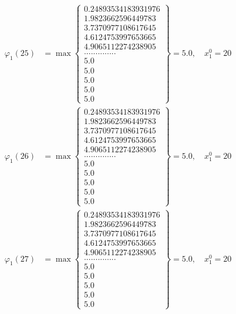 \documentclass{article}
\begin{document}
\begin{align*}
  
  
  
\varphi_{1}(25) &= \max \left\{ \begin{array}{c}
0.24893534183931976 \\
 1.9823662596449783 \\
 3.7370977108617645 \\
 4.6124753997653665 \\
 4.9065112274238905 \\
 .............. \\
 5.0 \\
 5.0 \\
 5.0 \\
 5.0 \\
 5.0
\end{array} \right\} = 5.0, \quad x_{1}^0 = 20\\
  
  
  
  
\varphi_{1}(26) &= \max \left\{ \begin{array}{c}
0.24893534183931976 \\
 1.9823662596449783 \\
 3.7370977108617645 \\
 4.6124753997653665 \\
 4.9065112274238905 \\
 .............. \\
 5.0 \\
 5.0 \\
 5.0 \\
 5.0 \\
 5.0
\end{array} \right\} = 5.0, \quad x_{1}^0 = 20\\
  
  
  
  
\varphi_{1}(27) &= \max \left\{ \begin{array}{c}
0.24893534183931976 \\
 1.9823662596449783 \\
 3.7370977108617645 \\
 4.6124753997653665 \\
 4.9065112274238905 \\
 .............. \\
 5.0 \\
 5.0 \\
 5.0 \\
 5.0 \\
 5.0
\end{array} \right\} = 5.0, \quad x_{1}^0 = 20\\
  

\end{align*}
\end{document}
